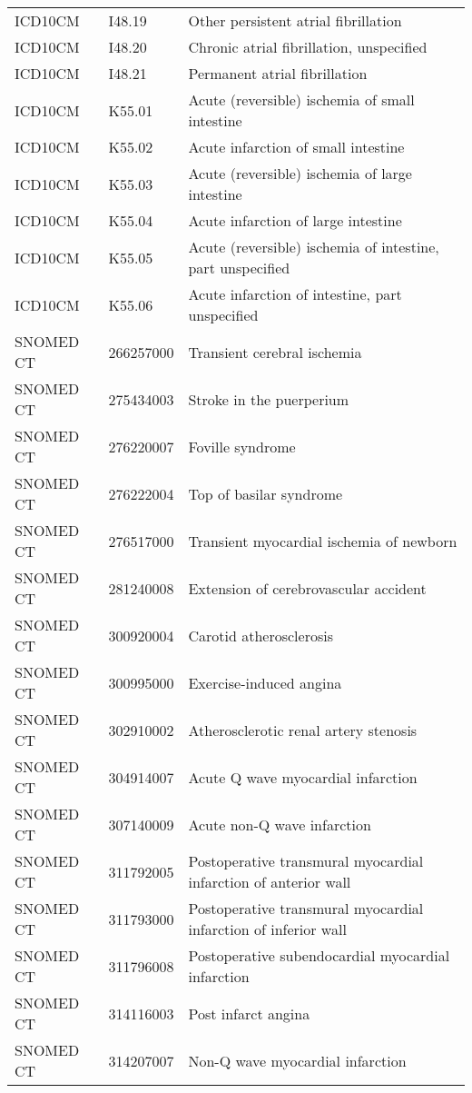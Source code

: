 \begin{longtable}{p{}p{}p{}}
  ICD10CM & I48.19 & Other persistent atrial fibrillation \\ 
  ICD10CM & I48.20 & Chronic atrial fibrillation, unspecified \\ 
  ICD10CM & I48.21 & Permanent atrial fibrillation \\ 
  ICD10CM & K55.01 & Acute (reversible) ischemia of small intestine \\ 
  ICD10CM & K55.02 & Acute infarction of small intestine \\ 
  ICD10CM & K55.03 & Acute (reversible) ischemia of large intestine \\ 
  ICD10CM & K55.04 & Acute infarction of large intestine \\ 
  ICD10CM & K55.05 & Acute (reversible) ischemia of intestine, part unspecified \\ 
  ICD10CM & K55.06 & Acute infarction of intestine, part unspecified \\ 
  SNOMED CT & 266257000 & Transient cerebral ischemia \\ 
  SNOMED CT & 275434003 & Stroke in the puerperium \\ 
  SNOMED CT & 276220007 & Foville syndrome \\ 
  SNOMED CT & 276222004 & Top of basilar syndrome \\ 
  SNOMED CT & 276517000 & Transient myocardial ischemia of newborn \\ 
  SNOMED CT & 281240008 & Extension of cerebrovascular accident \\ 
  SNOMED CT & 300920004 & Carotid atherosclerosis \\ 
  SNOMED CT & 300995000 & Exercise-induced angina \\ 
  SNOMED CT & 302910002 & Atherosclerotic renal artery stenosis \\ 
  SNOMED CT & 304914007 & Acute Q wave myocardial infarction \\ 
  SNOMED CT & 307140009 & Acute non-Q wave infarction \\ 
  SNOMED CT & 311792005 & Postoperative transmural myocardial infarction of anterior wall \\ 
  SNOMED CT & 311793000 & Postoperative transmural myocardial infarction of inferior wall \\ 
  SNOMED CT & 311796008 & Postoperative subendocardial myocardial infarction \\ 
  SNOMED CT & 314116003 & Post infarct angina \\ 
  SNOMED CT & 314207007 & Non-Q wave myocardial infarction \\ 

\end{longtable}
